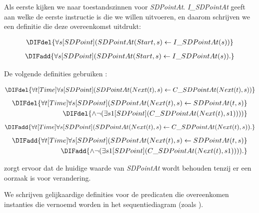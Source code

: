Als eerste kijken we naar toestandszinnen voor \textit{SDPointAt}. \textit{I\_SDPointAt} geeft aan welke de eerste instructie is die we willen uitvoeren, en daarom schrijven we een definitie die deze overeenkomst uitdrukt:

\DIFdelbegin \begin{eqnarray*}
	\DIFdel{\forall{s}[SDPoint](SDPointAt(Start, s) \leftarrow I\_SDPointAt(s))
}\end{eqnarray*}
\DIFdelend \DIFaddbegin \begin{align}
	\DIFadd{\forall{s}[SDPoint](SDPointAt(Start, s) \leftarrow I\_SDPointAt(s)).
}\end{align}
\DIFaddend 


De volgende definities gebruiken \DIFdelbegin \textit{}%
\DIFdelend \DIFaddbegin {}\DIFaddend :

\DIFdelbegin \begin{eqnarray*}
	\DIFdel{\forall{t}[Time]\forall{s}[SDPoint](SDPointAt(Next(t), s) \leftarrow C\_SDPointAt(Next(t), s))
}\end{eqnarray*}
\begin{eqnarray*}
	\DIFdel{\forall{t}[Time]\forall{s}[SDPoint](SDPointAt(Next(t), s) \leftarrow SDPointAt(t, s) }\\ \DIFdel{\land{} \space \lnot{}(\exists{s1}[SDPoint](C\_SDPointAt(Next(t), s1))))
}\end{eqnarray*}
\DIFdelend \DIFaddbegin \begin{align}
	\DIFadd{\forall{t}[Time]\forall{s}[SDPoint](SDPointAt(Next(t), s) \leftarrow C\_SDPointAt(Next(t), s)). \label{eq:sdcauses}
}\end{align}
\begin{align}
	\DIFadd{\forall{t}[Time]\forall{s}[SDPoint](SDPointAt(Next(t), s) \leftarrow SDPointAt(t, s) \nonumber }\\ \DIFadd{\land{} \space \lnot{}(\exists{s1}[SDPoint](C\_SDPointAt(Next(t), s1)))). \label{eq:sduncauses}
}\end{align}
\DIFaddend 

\DIFdelbegin {}\DIFdelend \DIFaddbegin {}\DIFaddend zorgt ervoor dat de huidige waarde van \textit{SDPointAt} wordt behouden tenzij er een oorzaak is voor verandering.

We schrijven gelijkaardige definities voor de predicaten die overeenkomen \DIFaddbegin {}\DIFaddend instanties die vernoemd worden in het sequentiediagram (zoals \textit{\DIFdelbegin {}\DIFdelend \DIFaddbegin {}\DIFaddend }).

